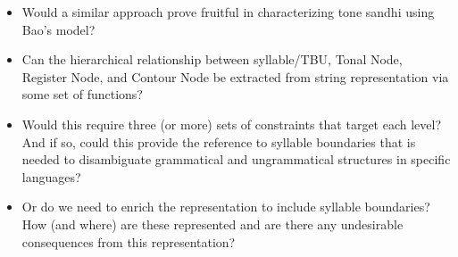 \documentclass{article}
\begin{document}
\begin{itemize}
	\item Would a similar approach prove fruitful in characterizing tone sandhi using Bao's model? 
	\item Can the hierarchical relationship between syllable/TBU, Tonal Node, Register Node, and Contour Node be extracted from string representation via some set of functions? 
	\item Would this require three (or more) sets of constraints that target each level? And if so, could this provide the reference to syllable boundaries that is needed to disambiguate grammatical and ungrammatical structures in specific languages?
	\item Or do we need to enrich the representation to include syllable boundaries? How (and where) are these represented and are there any undesirable consequences from this representation?
\end{itemize}
\end{document}
